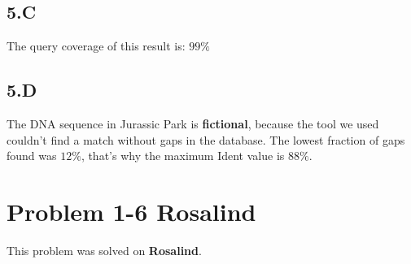 \documentclass{article}
\begin{document}
\subsection*{5.C}
The query coverage of this result is: $99\%$

\subsection*{5.D}
The DNA sequence in Jurassic Park is \textbf{fictional}, because the tool we used couldn't find a match without gaps in the database. The lowest fraction of gaps found was $12\%$, that's why the maximum Ident value is $88\%$.

\section*{Problem 1-6 Rosalind}

This problem was solved on \textbf{Rosalind}.
\end{document}
